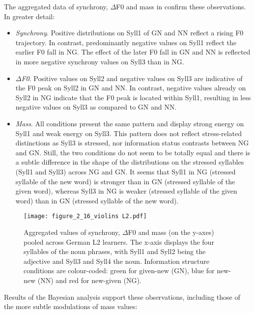 The aggregated data of synchrony, ${\Delta}$F0 and mass in  confirm these observations. In greater detail:

\begin{itemize}
\item \textit{Synchrony}. Positive distributions on Syll1 of GN and NN reflect a rising F0 trajectory. In contrast, predominantly negative values on Syll1 reflect the earlier F0 fall in NG. The effect of the later F0 fall in GN and NN is reflected in more negative synchrony values on Syll3 than in NG.
\item \textit{${\Delta}$F0}. Positive values on Syll2 and negative values on Syll3 are indicative of the F0 peak on Syll2 in GN and NN. In contrast, negative values already on Syll2 in NG indicate that the F0 peak is located within Syll1, resulting in less negative values on Syll3 as compared to GN and NN.
\item \textit{Mass}. All conditions present the same pattern and display strong energy on Syll1 and weak energy on Syll3. This pattern does not reflect stress-related distinctions as Syll3 is stressed, nor information status contrasts between NG and GN. Still, the two conditions do not seem to be totally equal and there is a subtle difference in the shape of the distributions on the stressed syllables (Syll1 and Syll3) across NG and GN. It seems that Syll1 in NG (stressed syllable of the new word) is stronger than in GN (stressed syllable of the given word), whereas Syll3 in NG is weaker (stressed syllable of the given word) than in GN (stressed syllable of the new word).
\end{itemize}


\begin{figure}
\texttt{[image: figure\_2\_16\_violins L2.pdf]}
\caption{Aggregated values of synchrony, ${\Delta}$F0 and mass (on the y-axes) pooled across German L2 learners. The x-axis displays the four syllables of the noun phrases, with Syll1 and Syll2 being the adjective and Syll3 and Syll4 the noun. Information structure conditions are colour-coded: green for given-new (GN), blue for new-new (NN) and red for new-given (NG).}
\label{fig:2.16}
\end{figure}

Results of the Bayesian analysis support these observations, including those of the more subtle modulations of mass values:

